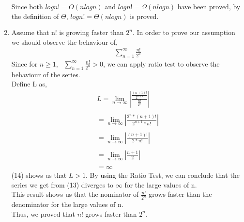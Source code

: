 \documentclass[11pt]{article}
\begin{document}
\begin{enumerate}
     Since both $ logn! = O(nlogn)$ and $ logn! = \Omega(nlogn)$ have been proved, by the definition of $\Theta$, $logn! = \Theta(nlogn)$ is proved.
		
	
	\item
    Assume that n! is growing faster than $2^n$. In order to prove our assumption we should observe the behaviour of,
    \begin{equation}
    \begin{split}
    \sum_{n=1}^{\infty}\frac{n!}{2^n}
    \end{split}
    \end{equation} 
    Since for $n\geq1$, \ $\sum_{n=1}^{\infty}\frac{n!}{2^n}>0$, we can apply ratio test to observe the behaviour of the series.\\
    Define L as,
    \begin{equation}
    \begin{split}
    L = \lim_{n\to\infty}{|\frac{\frac{(n+1)!}{2^{n+1}}}{\frac{n!}{2^n}}|}\\ \\
    =\lim_{n\to\infty}{|\frac{2^n*(n+1)!}{2^{n+1}*n!}|} \\ \\
    =\lim_{n\to\infty}{|\frac{(n+1)!}{2*n!}|} \\ \\
    =\lim_{n\to\infty}{|\frac{n+1}{2}|} \\ \\
    = \infty
    \end{split}
    \end{equation} 
    (14) shows us that $L > 1$. By using the Ratio Test, we can conclude that the series we get from (13) diverges to $\infty$ for the large values of n. \\ 
    This result shows us that the nominator of $\frac{n!}{2^n}$ grows faster than the denominator for the large values of n.\\
    Thus, we proved that $n!$ grows faster than $2^n$.
	
	
	
	

\end{enumerate}
\end{document}
